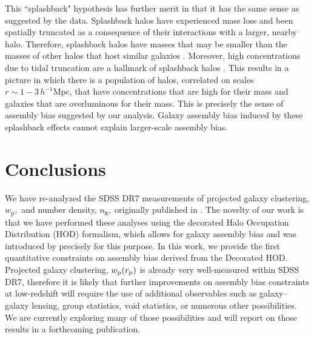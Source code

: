 \documentclass[usenatbib,usegraphicx,letterpaper]{mn2e}
\newcommand{\wprp}{w_{\mathrm{p}}}
\begin{document}
This ``splashback" hypothesis has further merit in that it has the same sense as suggested 
by the data. Splashback halos have experienced mass loss and been spatially truncated 
as a consequence of their interactions with a larger, nearby halo. Therefore, splashback halos 
have masses that may be smaller than the masses of other halos that host similar galaxies \citet{dalal_etal08}. 
Moreover, high concentrations due to tidal truncation are a hallmark of splashback 
halos \citep{wang_etal07,dalal_etal08,sunayama_etal16}. This results in a picture in which there is a population 
of halos, correlated on scales $r \sim 1-3\, h^{-1}\mathrm{Mpc}$, that have concentrations 
that are high for their mass and galaxies that are overluminous for their mass. This is precisely the 
sense of assembly bias suggested by our analysis. Galaxy assembly bias induced by these 
splashback effects cannot explain larger-scale assembly bias.


\section{Conclusions}
\label{section:conclusions}

We have re-analyzed the SDSS DR7 measurements of projected galaxy clustering,
$\wprp,$ and number density, $n_{\rm g},$ originally published in \citet{zehavi_etal11}.
The novelty of our work is that we have performed these analyses using the
decorated Halo Occupation Distribution (HOD) formalism, which allows for galaxy
assembly bias and was introduced by \citet{hearin_etal16} precisely for this purpose.
In this work, we provide the first quantitative constraints on
assembly bias derived from the Decorated HOD. Projected galaxy clustering, 
$\wprp(r_{\rm p})$ is already very well-measured within SDSS DR7, therefore it is likely 
that further improvements on assembly bias constraints at low-redshift will require the use of additional 
observables such as galaxy--galaxy lensing, group statistics, void statistics, or numerous other possibilities. 
We are currently exploring many of those possibilities and will report on those results in a forthcoming publication. 
\end{document}
